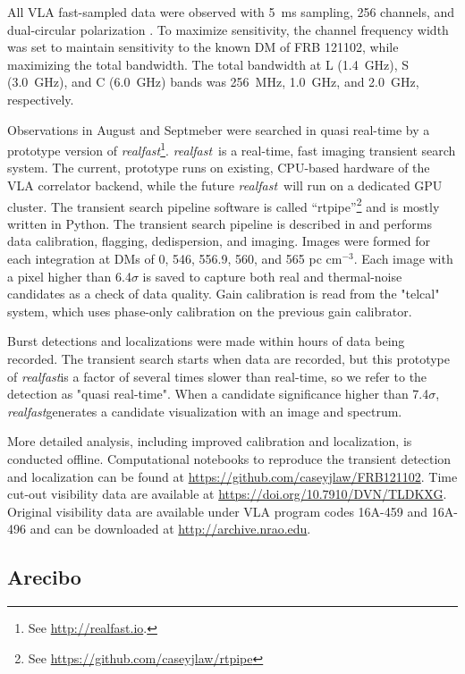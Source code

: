 \documentclass{emulateapj}
\newcommand{\rf}{\emph{realfast}}
\newcommand{\frb}{FRB 121102}
\begin{document}
All VLA fast-sampled data were observed with 5~ms sampling, 256 channels, and dual-circular polarization \citep[as in]{2015ApJ...807...16L}. To maximize sensitivity, the channel frequency width was set to maintain sensitivity to the known DM of \frb, while maximizing the total bandwidth. The total bandwidth at L (1.4~GHz), S (3.0~GHz), and C (6.0~GHz) bands was 256~MHz, 1.0~GHz, and 2.0~GHz, respectively.

Observations in August and Septmeber were searched in quasi real-time by a prototype version of \rf\footnote{See \url{http://realfast.io}.}. \rf\ is a real-time, fast imaging transient search system. The current, prototype runs on existing, CPU-based hardware of the VLA correlator backend, while the future \rf\ will run on a dedicated GPU cluster. The transient search pipeline software is called ``rtpipe''\footnote{See \url{https://github.com/caseyjlaw/rtpipe}} and is mostly written in Python. The transient search pipeline is described in \citet{2015ApJ...807...16L} and performs data calibration, flagging, dedispersion, and imaging. Images were formed for each integration at DMs of 0, 546, 556.9, 560, and 565 pc cm$^{-3}$. Each image with a pixel higher than 6.4$\sigma$ is saved to capture both real and thermal-noise candidates as a check of data quality. Gain calibration is read from the "telcal" system, which uses phase-only calibration on the previous gain calibrator.

Burst detections and localizations were made within hours of data being recorded. The transient search starts when data are recorded, but this prototype of \rf is a factor of several times slower than real-time, so we refer to the detection as "quasi real-time". When a candidate significance higher than 7.4$\sigma$, \rf generates a candidate visualization with an image and spectrum. 

More detailed analysis, including improved calibration and localization, is conducted offline. Computational notebooks to reproduce the transient detection and localization can be found at \url{https://github.com/caseyjlaw/FRB121102}. Time cut-out visibility data are available at \url{https://doi.org/10.7910/DVN/TLDKXG}. Original visibility data are available under VLA program codes 16A-459 and 16A-496 and can be downloaded at \url{http://archive.nrao.edu}.

\subsection{Arecibo}
\end{document}
